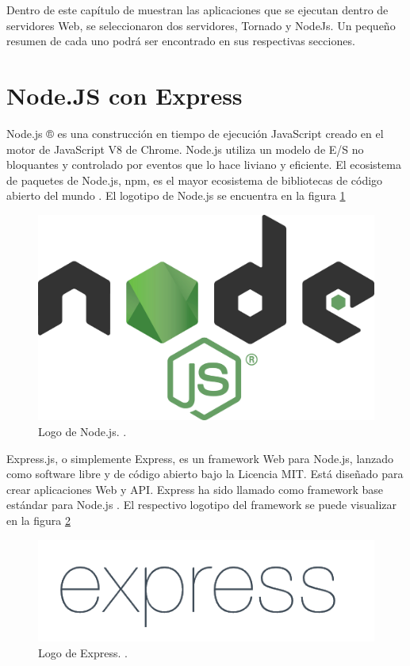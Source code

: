 Dentro de este capítulo de muestran las aplicaciones que se ejecutan dentro de servidores Web, se seleccionaron dos servidores, Tornado y NodeJs. Un pequeño resumen de cada uno podrá ser encontrado en sus respectivas secciones.

\section{Node.JS con Express}
Node.js ® es una construcción en tiempo de ejecución JavaScript creado en el motor de JavaScript V8 de Chrome. Node.js utiliza un modelo de E/S no bloquantes y controlado por eventos que lo hace liviano y eficiente. El ecosistema de paquetes de Node.js, npm, es el mayor ecosistema de bibliotecas de código abierto del mundo \cite{Node}. El logotipo de Node.js se encuentra en la figura \ref{node}

\FloatBarrier
\begin{figure}[htbp!]
		\centering
			\includegraphics[width=0.3 \textwidth]{imagenes/logoNode}
		\caption{Logo de Node.js. \cite{Node}.}
		\label{node}
\end{figure}
\FloatBarrier

Express.js, o simplemente Express, es un framework Web para Node.js, lanzado como software libre y de código abierto bajo la Licencia MIT. Está diseñado para crear aplicaciones Web y API. Express ha sido llamado como framework base estándar para Node.js \cite{Express}. El respectivo logotipo del framework se puede visualizar en la figura \ref{Express}


\FloatBarrier
\begin{figure}[htbp!]
		\centering
			\includegraphics[width=0.3 \textwidth]{imagenes/Expressjs}
		\caption{Logo de Express. \cite{Express}.}
		\label{Express}
\end{figure}
\FloatBarrier
